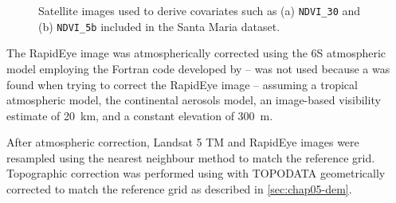 \begin{figure}[!ht]
\begin{minipage}[b]{0.45\textwidth}
\end{minipage} 
\caption[Satellite images included in the Santa Maria dataset.]{Satellite images used to derive covariates 
such as (a) \texttt{NDVI\_30} and (b) \texttt{NDVI\_5b} included in the Santa Maria dataset.}
\label{fig:chap05-sat-image}
\end{figure}


The RapidEye image was atmospherically corrected using the 6S atmospheric model \cite{VermoteEtAl1997} 
employing the Fortran code developed by  --  was not used because 
a \atcorrbug{} was found when trying to correct the RapidEye image -- assuming a tropical atmospheric model, 
the continental aerosols model, an image-based visibility estimate of \SI{20}{\km}, and a constant elevation 
of \SI{300}{\m}.

After atmospheric correction, Landsat 5 TM and RapidEye images were resampled using the nearest neighbour 
method to match the reference grid. Topographic correction was performed using  with 
TOPODATA geometrically corrected to match the reference grid as described in \autoref{sec:chap05-dem}.

